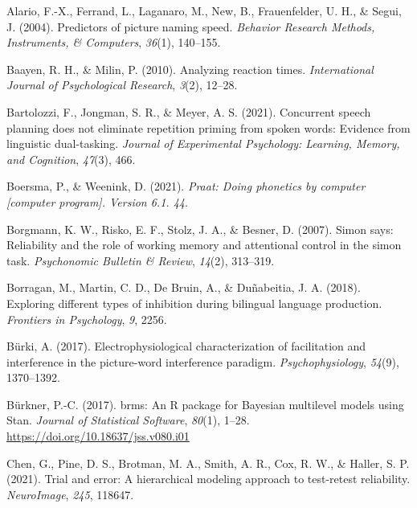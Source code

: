 \documentclass[
  man,floatsintext]{apa6}
\newlength{\cslhangindent}
\newlength{\cslentryspacingunit} %
\newenvironment{CSLReferences}[2] %
 {%
  \setlength{\parindent}{0pt}
  \ifodd #1
  \let\oldpar\par
  \def\par{\hangindent=\cslhangindent\oldpar}
  \fi
  \setlength{\parskip}{#2\cslentryspacingunit}
 }%
 {}
\begin{document}
\hypertarget{refs}{}
\begin{CSLReferences}{1}{0}
\leavevmode{}%
Alario, F.-X., Ferrand, L., Laganaro, M., New, B., Frauenfelder, U. H., \& Segui, J. (2004). Predictors of picture naming speed. \emph{Behavior Research Methods, Instruments, \& Computers}, \emph{36}(1), 140--155.

\leavevmode{}%
Baayen, R. H., \& Milin, P. (2010). Analyzing reaction times. \emph{International Journal of Psychological Research}, \emph{3}(2), 12--28.

\leavevmode{}%
Bartolozzi, F., Jongman, S. R., \& Meyer, A. S. (2021). Concurrent speech planning does not eliminate repetition priming from spoken words: Evidence from linguistic dual-tasking. \emph{Journal of Experimental Psychology: Learning, Memory, and Cognition}, \emph{47}(3), 466.

\leavevmode{}%
Boersma, P., \& Weenink, D. (2021). \emph{Praat: Doing phonetics by computer {[}computer program{]}. Version 6.1. 44}.

\leavevmode{}%
Borgmann, K. W., Risko, E. F., Stolz, J. A., \& Besner, D. (2007). Simon says: Reliability and the role of working memory and attentional control in the simon task. \emph{Psychonomic Bulletin \& Review}, \emph{14}(2), 313--319.

\leavevmode{}%
Borragan, M., Martin, C. D., De Bruin, A., \& Duñabeitia, J. A. (2018). Exploring different types of inhibition during bilingual language production. \emph{Frontiers in Psychology}, \emph{9}, 2256.

\leavevmode{}%
Bürki, A. (2017). Electrophysiological characterization of facilitation and interference in the picture-word interference paradigm. \emph{Psychophysiology}, \emph{54}(9), 1370--1392.

\leavevmode{}%
Bürkner, P.-C. (2017). {brms}: An {R} package for {Bayesian} multilevel models using {Stan}. \emph{Journal of Statistical Software}, \emph{80}(1), 1--28. \url{https://doi.org/10.18637/jss.v080.i01}

\leavevmode{}%
Chen, G., Pine, D. S., Brotman, M. A., Smith, A. R., Cox, R. W., \& Haller, S. P. (2021). Trial and error: A hierarchical modeling approach to test-retest reliability. \emph{NeuroImage}, \emph{245}, 118647.


\end{CSLReferences}
\end{document}
